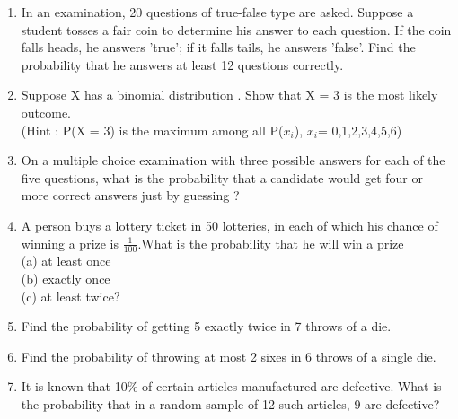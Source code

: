 \begin{enumerate}[label=\arabic*.,ref=\thesubsection.\theenumi]
\item In an examination, 20 questions of true-false type are asked. Suppose a student tosses a fair coin to determine his answer to each question. If the coin falls heads, he answers 'true'; if it falls tails, he answers 'false'. Find the probability that he answers at least 12 questions correctly.\\

\item Suppose X has a binomial distribution . Show that X = 3 is the most likely outcome.\\
(Hint : P(X = 3) is the maximum among all P($x_i$), $x_i$= 0,1,2,3,4,5,6)\\

\item On a multiple choice examination with three possible answers for each of the five questions, what is the probability that a candidate would get four or more correct answers just by guessing ?\\

\item A person buys a lottery ticket in 50 lotteries, in each of which his chance of
winning a prize is $\frac{1}{100}$.What is the probability that he will win a prize\\
(a) at least once \\
(b) exactly once \\
(c) at least twice?\\

\item Find the probability of getting 5 exactly twice in 7 throws of a die.\\

\item Find the probability of throwing at most 2 sixes in 6 throws of a single die.\\

\item It is known that 10$\%$ of certain articles manufactured are defective. What is the probability that in a random sample of 12 such articles, 9 are defective?\\


\end{enumerate}
